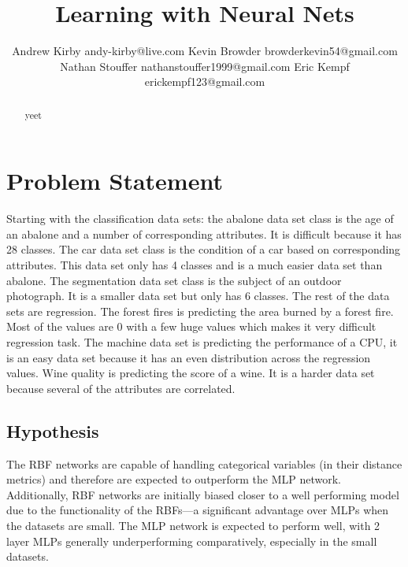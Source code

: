 \documentclass[twoside,11pt]{article}
\begin{document}
\title{Learning with Neural Nets}

\author{\name Andrew Kirby \email andy-kirby@live.com \AND
		\name Kevin Browder \email browderkevin54@gmail.com \AND
		\name Nathan Stouffer \email nathanstouffer1999@gmail.com \AND
		\name Eric Kempf \email erickempf123@gmail.com }

\maketitle

\begin{abstract}
yeet
\end{abstract}

\section{Problem Statement}
Starting with the classification data sets: the abalone data set class is the  age of an abalone and a number of corresponding attributes. It is difficult because it has 28 classes. The car data set class is the condition of a car based on corresponding attributes. This data set only has 4 classes and is a much easier data set than abalone. The segmentation data set class is the subject of an outdoor photograph. It is a smaller data set but only has 6 classes. The rest of the data sets are regression. The forest fires is predicting the area burned by a forest fire. Most of the values are 0 with a few huge values which makes it very difficult regression task. The machine data set is predicting the performance of a CPU, it is an easy data set because it has an even distribution across the regression values. Wine quality is predicting the score of a wine. It is a harder data set because several of the attributes are correlated.


\subsection*{Hypothesis}

The RBF networks are capable of handling categorical variables (in their distance metrics) and therefore are expected to outperform the MLP network. Additionally, RBF networks are initially biased closer to a well performing model due to the functionality of the RBFs---a significant advantage over MLPs when the datasets are small. The MLP network is expected to perform well, with 2 layer MLPs generally underperforming comparatively, especially in the small datasets.
\end{document}
